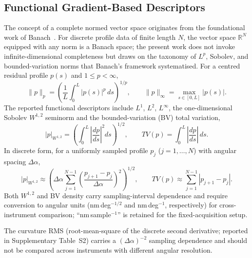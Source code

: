\documentclass[review]{elsarticle}
\begin{document}
\subsection{Functional Gradient-Based Descriptors}
The concept of a complete normed vector space originates from the foundational work of Banach~\cite{Banach1932}. For discrete profile data of finite length $N$, the vector space $\mathbb{R}^N$ equipped with any norm is a Banach space; the present work does not invoke infinite-dimensional completeness but draws on the taxonomy of $L^p$, Sobolev, and bounded-variation norms that Banach's framework systematised. For a centred residual profile $p(s)$ and $1\leq p<\infty$,
\begin{equation}
\|p\|_{p}=\left(\frac{1}{L}\int_0^L |p(s)|^p\,ds\right)^{1/p}, \qquad
\|p\|_{\infty}=\max_{s\in[0,L]}|p(s)|.
\end{equation}
The reported functional descriptors include $L^1$, $L^2$, $L^\infty$, the one-dimensional Sobolev $W^{1,2}$ seminorm and the bounded-variation (BV) total variation,
\begin{equation}
|p|_{W^{1,2}}=\left(\int_0^L\left|\frac{dp}{ds}\right|^2 ds\right)^{\!1/2}, \qquad TV(p)=\int_0^L \left|\frac{dp}{ds}\right|\,ds.
\end{equation}
In discrete form, for a uniformly sampled profile $p_j$ ($j=1,\dots,N$) with angular spacing $\Delta\alpha$,
\begin{equation}
|p|_{W^{1,2}} \approx \left(\Delta\alpha\sum_{j=1}^{N-1}\left(\frac{p_{j+1}-p_j}{\Delta\alpha}\right)^2\right)^{\!1/2}, \qquad
TV(p) \approx \sum_{j=1}^{N-1}|p_{j+1}-p_j|.
\end{equation}
Both $W^{1,2}$ and BV density carry sampling-interval dependence and require conversion to angular units (nm\,deg$^{-1/2}$ and nm\,deg$^{-1}$, respectively) for cross-instrument comparison; ``nm\,sample$^{-1}$'' is retained for the fixed-acquisition setup.

The curvature RMS (root-mean-square of the discrete second derivative; reported in Supplementary Table~S2) carries a $(\Delta\alpha)^{-2}$ sampling dependence and should not be compared across instruments with different angular resolution.
\end{document}
